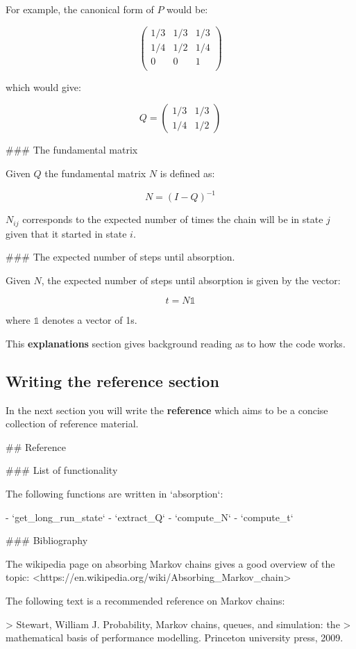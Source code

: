\begin{md}
For example, the canonical form of $P$ would be:

$$
    \begin{pmatrix}
        1 / 3 & 1 / 3 & 1 / 3 \\
        1 / 4 & 1 / 2 & 1 / 4 \\
        0     &  0    & 1     \\
    \end{pmatrix}
$$

which would give:

$$
Q = \begin{pmatrix}
    1 / 3 & 1 / 3 \\
    1 / 4 & 1 / 2
    \end{pmatrix}
$$

### The fundamental matrix

Given $Q$ the fundamental matrix $N$ is defined as:

$$N = (I - Q) ^{-1}$$

$N_{ij}$ corresponds to the expected number of times the chain will be in state
$j$ given that it started in state $i$.

### The expected number of steps until absorption.

Given $N$, the expected number of steps until absorption is given by the vector:

$$
t = N \mathbb{1}
$$

where $\mathbb{1}$ denotes a vector of 1s.
\end{md}

This \textbf{explanations} section gives background reading as to how the code works.


\subsection{Writing the reference section}
\label{\detokenize{building-tools/06-documentation/tutorial/main:writing-the-reference-section}}

In the next section you will write the \textbf{reference} which aims to be a concise
collection of reference material.

\begin{md}
## Reference

### List of functionality

The following functions are written in `absorption`:

- `get_long_run_state`
- `extract_Q`
- `compute_N`
- `compute_t`

### Bibliography

The wikipedia page on absorbing Markov chains gives a good overview of the
topic: <https://en.wikipedia.org/wiki/Absorbing_Markov_chain>

The following text is a recommended reference on Markov chains:

> Stewart, William J. Probability, Markov chains, queues, and simulation: the
> mathematical basis of performance modelling. Princeton university press, 2009.
\end{md}

